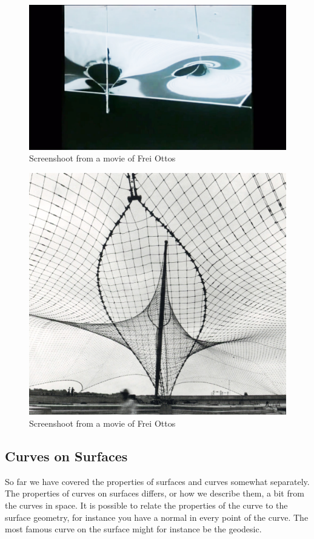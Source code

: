 \begin{figure}[H] 
\centering
\includegraphics[width=0.9\linewidth ]{figure/Theory/SoapSreeen.jpg}
\caption{Screenshoot from a movie of Frei Ottos}
\end{figure}


\begin{figure}[H] 
\centering
\includegraphics[width=0.9\linewidth ]{figure/Theory/FreiOtto.jpg}
\caption{Screenshoot from a movie of Frei Ottos}
\end{figure}



\subsection{Curves on Surfaces}

So far we have covered the properties of surfaces and curves somewhat separately. The properties of curves on surfaces differs, or how we describe them, a bit from the curves in  space. It is possible to relate the properties of the curve to the surface geometry, for instance you have a normal in every point of the curve. The most famous curve on the surface might for instance be the geodesic.

